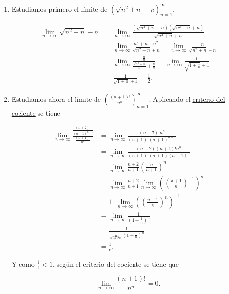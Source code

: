 \documentclass[
  spanish,
  a4paper,
]{scrreport}
\theoremstyle{definition}
\theoremstyle{remark}
\begin{document}
\begin{tcolorbox}[enhanced jigsaw, arc=.35mm, bottomrule=.15mm, bottomtitle=1mm, breakable, colback=white, colbacktitle=quarto-callout-tip-color!10!white, colframe=quarto-callout-tip-color-frame, coltitle=black, left=2mm, leftrule=.75mm, opacityback=0, opacitybacktitle=0.6, rightrule=.15mm, title=\textcolor{quarto-callout-tip-color}{\faLightbulb}\hspace{0.5em}{Solución}, titlerule=0mm, toprule=.15mm, toptitle=1mm]

\begin{enumerate}
\def\labelenumi{\alph{enumi}.}
\item
  Estudiamos primero el límite de
  \(\left(\sqrt{n^2+n}-n\right)_{n=1}^\infty\).

  \begin{align*}
  \lim_{n\to\infty} \sqrt{n^2+n}-n 
  &= \lim_{n\to\infty} \frac{(\sqrt{n^2+n}-n)(\sqrt{n^2+n}+n)}{\sqrt{n^2+n}+n}\\
  &= \lim_{n\to\infty} \frac{n^2+n-n^2}{\sqrt{n^2+n}+n}
  = \lim_{n\to\infty} \frac{n}{\sqrt{n^2+n}+n}\\
  &= \lim_{n\to\infty} \frac{\frac{n}{n}}{\frac{\sqrt{n^2+n}}{n}+\frac{n}{n}}
  = \lim_{n\to\infty} \frac{1}{\sqrt{1+\frac{1}{n}}+1}\\
  &= \frac{1}{\sqrt{1+0}+1} = \frac{1}{2}.
  \end{align*}
\item
  Estudiamos ahora el límite de
  \(\left(\frac{(n+1)!}{n^n}\right)_{n=1}^\infty\). Aplicando el
  \href{https://aprendeconalf.es/analisis-manual/04-sucesiones.html\#prp-criterio-cociente-sucesiones}{criterio
  del cociente} se tiene

  \begin{align*}
  \lim_{n\to\infty} \frac{\frac{(n+2)!}{(n+1)^{n+1}}}{\frac{(n+1)!}{n^n}}
  &= \lim_{n\to\infty} \frac{(n+2)!n^n}{(n+1)!(n+1)^{n+1}} \\
  &= \lim_{n\to\infty} \frac{(n+2)(n+1)! n^n}{(n+1)!(n+1)(n+1)^n} \\
  &= \lim_{n\to\infty} \frac{n+2}{n+1}\left(\frac{n}{n+1}\right)^n \\
  &= \lim_{n\to\infty} \frac{n+2}{n+1}\lim_{n\to\infty}\left(\left(\frac{n+1}{n}\right)^{-1}\right)^n\\ 
  &= 1\cdot \lim_{n\to\infty}\left(\left(\frac{n+1}{n}\right)^n\right)^{-1} \\
  &=  \lim_{n\to\infty}\frac{1}{\left(1+\frac{1}{n}\right)^n} \\
  &= \frac{1}{\lim_{n\to\infty}\left(1+\frac{1}{n}\right)^n} \\
  &= \frac{1}{e}.
  \end{align*}

  Y como \(\frac{1}{e}<1\), según el criterio del cociente se tiene que

  \[
  \lim_{n\to\infty} \frac{(n+1)!}{n^n} = 0. 
  \]
\end{enumerate}

\end{tcolorbox}
\end{document}
